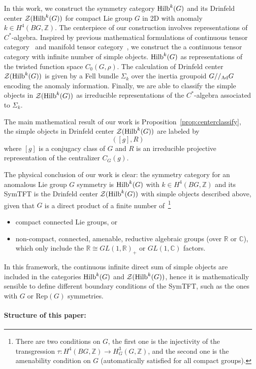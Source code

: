 \documentclass[a4paper,11pt]{article}
\newcommand{\be}{\begin{equation}}
\newcommand{\ee}{\end{equation}}
\def\mb{\mathbb}
\def\mc{\mathcal}
\def\bbZ{\mathbb{Z}}
\def\CZ{\mathcal{Z}}
\def\hilb{{\rm Hilb}}
\def\gmg{G//_{\rm Ad} G}
\begin{document}
In this work, we construct the symmetry category $\hilb^k(G)$ and its Drinfeld center $\CZ(\hilb^k(G))$ for compact Lie group $G$ in $2$D with anomaly $k\in H^4(BG,\bbZ)$. The centerpiece of our construction involves representations of $C^*$-algebra. Inspired by previous mathematical formulations of continuous tensor category~\cite{Marin-Salvador:2025stc} and manifold tensor category~\cite{Weis:2022egw}, we construct the a continuous tensor category with infinite number of simple objects. $\hilb^k(G)$ as representations of the twisted function space $C_0(G,\rho)$. The calculation of Drinfeld center $\CZ(\hilb^k(G))$ is given by a Fell bundle $\Sigma_k$ over the inertia groupoid $\gmg$ encoding the anomaly information. Finally, we are able to classify the simple objects in $\CZ(\hilb^k(G))$ as irreducible representations of the $C^*$-algebra associated to $\Sigma_k$.

The main mathematical result of our work is Proposition~\ref{prop:centerclassify}, the simple objects in Drinfeld center $\CZ(\hilb^k(G))$ are labeled by 
\be ([g], R )  \ee
where $[g]$ is a conjugacy class of $G$ and $R$ is an irreducible projective representation of the centralizer $C_G(g)$.

The physical conclusion of our work is clear: the symmetry category for an anomalous Lie group $G$ symmetry is $\hilb^k(G)$ with $k\in H^4(BG,\mb{Z})$ and its SymTFT is the Drinfeld center $\mc{Z}(\hilb^k(G))$ with simple objects described above, given that $G$ is a direct product of a finite number of~\footnote{There are two conditions on $G$, the first one is the injectivity of the transgression $\tau:H^4(BG,\mb{Z})\rightarrow H^3_G(G,\mb{Z})$, and the second one is the amenability condition on $G$ (automatically satisfied for all compact groups).}
\begin{itemize}
    \item compact connected Lie groups, or
    \item non-compact, connected, amenable, reductive algebraic groups (over $\mathbb{R}$ or $\mathbb{C}$), which only include the $\mb{R}\cong GL(1,\mb{R})_+$ or $GL(1,\mb{C})$ factors.
\end{itemize}
In this framework, the continuous infinite direct sum of simple objects are included in the categories $\hilb^k(G)$ and $\mc{Z}(\hilb^k(G))$, hence it is mathematically sensible to define different boundary conditions of the SymTFT, such as the ones with $G$ or Rep$(G)$ symmetries.

\paragraph{Structure of this paper:} 
\end{document}
